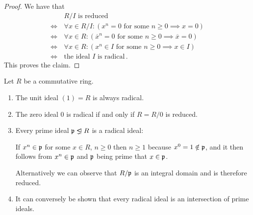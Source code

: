 \begin{proof}
  We have that
  \begin{align*}
        &\, \text{$R/I$ is reduced} \\
    \iff&\, \forall x \in R/I : (\text{$x^n = 0$ for some $n \geq 0$} \implies x = 0) \\
    \iff&\, \forall x \in R   : (\text{$\overline{x}^n = 0$ for some $n \geq 0$} \implies \overline{x} = 0) \\
    \iff&\, \forall x \in R   : (\text{$x^n \in I$ for some $n \geq 0$} \implies x \in I) \\
    \iff&\, \text{the ideal $I$ is radical} \,.
  \end{align*}
  This proves the claim.
\end{proof}


\begin{example}
  Let $R$ be a commutative ring.
  \begin{enumerate}
    \item
      The unit ideal $(1) = R$ is always radical.
    \item
      The zero ideal $0$ is radical if and only if $R = R/0$ is reduced.
    \item
      Every prime ideal $\mf{p} \ideallneq R$ is a radical ideal:
      
      If $x^n \in \mathfrak{p}$ for some $x \in R$, $n \geq 0$ then $n \geq 1$ because $x^0 = 1 \notin \mathfrak{p}$, and it then follows from $x^n \in \mathfrak{p}$ and $\mathfrak{p}$ being prime that $x \in \mathfrak{p}$.
      
      Alternatively we can observe that $R/\mathfrak{p}$ is an integral domain and is therefore reduced.
    \item
      It can conversely be shown that every radical ideal is an intersection of prime ideals.
  \end{enumerate}
\end{example}


